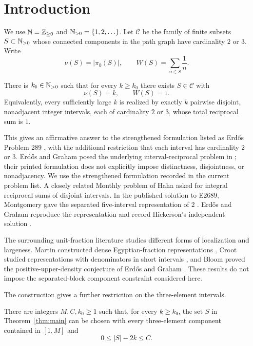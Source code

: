 \section{Introduction}
\label{sec:introduction}

We use $\mathbb N=\mathbb Z_{\ge0}$ and $\mathbb N_{>0}=\{1,2,\ldots\}$.  Let $\mathcal C$ be the family of finite subsets $S\subset\mathbb N_{>0}$ whose connected components in the path graph have cardinality $2$ or $3$.  Write
\[
\nu(S)=|\pi_0(S)|,
\qquad
W(S)=\sum_{n\in S}\frac1n.
\]

\begin{theorem}\label{thm:main}
There is $k_0\in\mathbb N_{>0}$ such that for every $k\ge k_0$ there exists $S\in\mathcal C$ with
\[
\nu(S)=k,
\qquad
W(S)=1.
\]
Equivalently, every sufficiently large $k$ is realized by exactly $k$ pairwise disjoint, nonadjacent integer intervals, each of cardinality $2$ or $3$, whose total reciprocal sum is $1$.
\end{theorem}

This gives an affirmative answer to the strengthened formulation listed as Erd\H{o}s Problem 289 \cite{ErdosProblem289}, with the additional restriction that each interval has cardinality $2$ or $3$.  Erd\H{o}s and Graham posed the underlying interval-reciprocal problem in \cite[p.~34]{ErdosGraham1980}; their printed formulation does not explicitly impose distinctness, disjointness, or nonadjacency.  We use the strengthened formulation recorded in the current problem list.  A closely related Monthly problem of Hahn \cite[p.~47]{ElementaryProblems1978} asked for integral reciprocal sums of disjoint intervals.  In the published solution to E2689, Montgomery gave the separated five-interval representation of $2$ \cite[p.~224]{E2689Solution1979}.  Erd\H{o}s and Graham reproduce the representation and record Hickerson's independent solution \cite[p.~34]{ErdosGraham1980}.

The surrounding unit-fraction literature studies different forms of localization and largeness.  Martin constructed dense Egyptian-fraction representations \cite{Martin2000}, Croot studied representations with denominators in short intervals \cite{Croot2001}, and Bloom proved the positive-upper-density conjecture of Erd\H{o}s and Graham \cite{Bloom2025}.  These results do not impose the separated-block component constraint considered here.

The construction gives a further restriction on the three-element intervals.

\begin{corollary}\label{cor:bounded-ternary}
There are integers $M,C,k_0\ge1$ such that, for every $k\ge k_0$, the set $S$ in Theorem~\ref{thm:main} can be chosen with every three-element component contained in $[1,M]$ and
\[
0\le |S|-2k\le C.
\]
\end{corollary}

